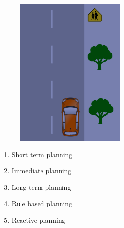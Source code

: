 \begin{enumerate}
\begin{figure}[!htb]
\begin{center}
\includegraphics[scale=0.280]{img/intro_self_driving/summary_question_scenario_5.png}
\end{center}
\label{summary_question_scenario_5}
\end{figure}

\begin{enumerate}
\item Short term planning
\item Immediate planning
\item Long term planning
\item Rule based planning
\item Reactive planning
\end{enumerate}

\end{enumerate}
